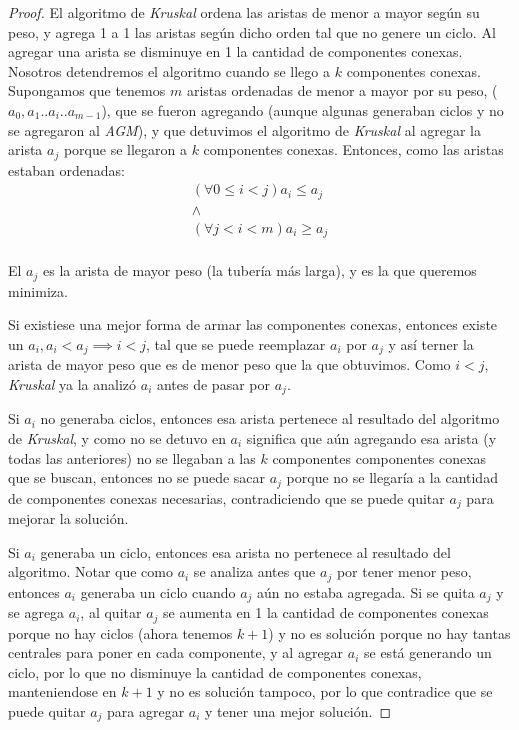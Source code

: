 \begin{proof}
	El algoritmo de \emph{Kruskal} ordena las aristas de menor a mayor seg\'un su peso, y agrega 1 a 1 las aristas seg\'un dicho orden tal que no genere un ciclo. Al agregar una arista se disminuye en 1 la cantidad de componentes conexas.  Nosotros detendremos el algoritmo cuando se llego a $k$ componentes conexas.
	Supongamos que tenemos $m$ aristas ordenadas de menor a mayor por su peso, ($a_0, a_1 .. a_i .. a_{m-1}$), que se fueron agregando (aunque algunas generaban ciclos y no se agregaron al \emph{AGM}), y que detuvimos el algoritmo de \emph{Kruskal} al agregar la arista $a_j$ porque se llegaron a $k$ componentes conexas. Entonces, como las aristas estaban ordenadas:
	\begin{equation*}
	\begin{split}
		(\forall 0 \leq i < j) a_i \leq a_j \\
		\land \\
		(\forall j < i < m) a_i \geq a_j \\
	\end{split}
	\end{equation*}

	El $a_j$ es la arista de mayor peso (la tuber\'ia m\'as larga), y es la que queremos minimiza.

	Si existiese una mejor forma de armar las componentes conexas, entonces existe un $a_i, a_i < a_j \implies i < j$, tal que se puede reemplazar $a_i$ por $a_j$ y as\'i terner la arista de mayor peso que es de menor peso que la que obtuvimos. Como $i < j$, \emph{Kruskal} ya la analiz\'o $a_i$ antes de pasar por $a_j$.

	Si $a_i$ no generaba ciclos, entonces esa arista pertenece al resultado del algoritmo de \emph{Kruskal}, y como no se detuvo en $a_i$ significa que a\'un agregando esa arista (y todas las anteriores) no se llegaban a las $k$ componentes componentes conexas que se buscan, entonces no se puede sacar $a_j$ porque no se llegar\'ia a la cantidad de componentes conexas necesarias, contradiciendo que se puede quitar $a_j$ para mejorar la soluci\'on.

	Si $a_i$ generaba un ciclo, entonces esa arista no pertenece al resultado del algoritmo. Notar que como $a_i$ se analiza antes que $a_j$ por tener menor peso, entonces $a_i$ generaba un ciclo cuando $a_j$ a\'un no estaba agregada. Si se quita $a_j$ y se agrega $a_i$, al quitar $a_j$ se aumenta en 1 la cantidad de componentes conexas porque no hay ciclos (ahora tenemos $k + 1$) y no es soluci\'on porque no hay tantas centrales para poner en cada componente, y al agregar $a_i$ se est\'a generando un ciclo, por lo que no disminuye la cantidad de componentes conexas, manteniendose en $k + 1$ y no es soluci\'on tampoco, por lo que contradice que se puede quitar $a_j$ para agregar $a_i$ y tener una mejor soluci\'on.


\end{proof}
